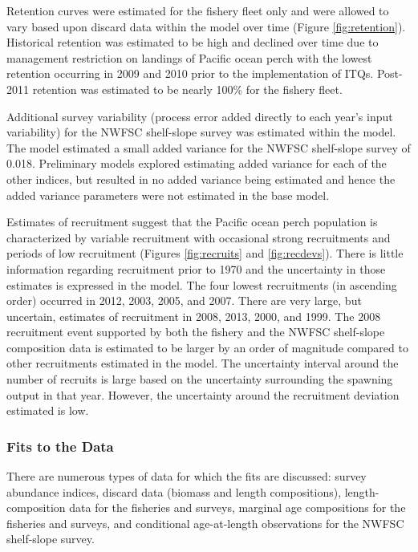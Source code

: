 \documentclass[12pt,]{article}
\begin{document}
Retention curves were estimated for the fishery fleet only and were
allowed to vary based upon discard data within the model over time
(Figure \ref{fig:retention}). Historical retention was estimated to be
high and declined over time due to management restriction on landings of
Pacific ocean perch with the lowest retention occurring in 2009 and 2010
prior to the implementation of ITQs. Post-2011 retention was estimated
to be nearly 100\% for the fishery fleet.

Additional survey variability (process error added directly to each
year's input variability) for the NWFSC shelf-slope survey was estimated
within the model. The model estimated a small added variance for the
NWFSC shelf-slope survey of 0.018. Preliminary models explored
estimating added variance for each of the other indices, but resulted in
no added variance being estimated and hence the added variance
parameters were not estimated in the base model.

Estimates of recruitment suggest that the Pacific ocean perch population
is characterized by variable recruitment with occasional strong
recruitments and periods of low recruitment (Figures \ref{fig:recruits}
and \ref{fig:recdevs}). There is little information regarding
recruitment prior to 1970 and the uncertainty in those estimates is
expressed in the model. The four lowest recruitments (in ascending
order) occurred in 2012, 2003, 2005, and 2007. There are very large, but
uncertain, estimates of recruitment in 2008, 2013, 2000, and 1999. The
2008 recruitment event supported by both the fishery and the NWFSC
shelf-slope composition data is estimated to be larger by an order of
magnitude compared to other recruitments estimated in the model. The
uncertainty interval around the number of recruits is large based on the
uncertainty surrounding the spawning output in that year. However, the
uncertainty around the recruitment deviation estimated is low.

\subsubsection{Fits to the Data}\label{fits-to-the-data}

There are numerous types of data for which the fits are discussed:
survey abundance indices, discard data (biomass and length
compositions), length-composition data for the fisheries and surveys,
marginal age compositions for the fisheries and surveys, and conditional
age-at-length observations for the NWFSC shelf-slope survey.
\end{document}
